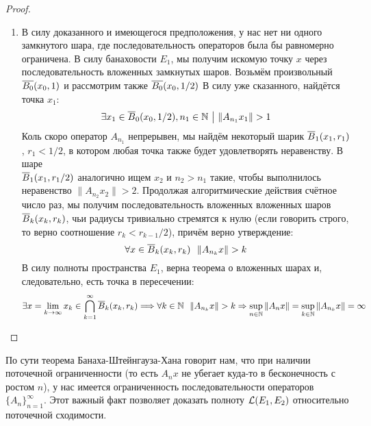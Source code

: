\begin{proof}
\begin{enumerate}
		\item В силу доказанного и имеющегося предположения, у нас нет ни одного замкнутого шара, где последовательность операторов была бы равномерно ограничена. В силу банаховости $E_1$, мы получим искомую точку $x$ через последовательность вложенных замкнутых шаров. Возьмём произвольный $\overline{B_0}(x_0, 1)$ и рассмотрим также $\overline{B_0}(x_0, 1 / 2)$ В силу уже сказанного, найдётся точка $x_1$:
		\[
			\exists x_1 \in \overline{B}_0(x_0, 1 / 2), n_1 \in \mathbb{N} \ \big|\  \|A_{n_1}x_1\| > 1
		\]
		Коль скоро оператор $A_{n_1}$ непрерывен, мы найдём некоторый шарик $\overline{B}_1(x_1, r_1)$, $r_1 < 1 / 2$, в котором любая точка также будет удовлетворять неравенству. В шаре \\ $\overline{B}_1(x_1, r_1 / 2)$ аналогично ищем $x_2$ и $n_2 > n_1$ такие, чтобы выполнилось неравенство $\|A_{n_2}x_2\| > 2$. Продолжая алгоритмические действия счётное число раз, мы получим последовательность вложенных вложенных шаров $\overline{B}_k(x_k, r_k)$, чьи радиусы тривиально стремятся к нулю (если говорить строго, то верно соотношение $r_k < r_{k - 1} / 2$), причём верно утверждение:
		\[
			\forall x \in \overline{B}_k(x_k, r_k)\ \ \|A_{n_k}x\| > k
		\]
		В силу полноты пространства $E_1$, верна теорема о вложенных шарах и, следовательно, есть точка в пересечении:
		\[
			\exists x = \lim_{k \to \infty} x_k \in \bigcap_{k = 1}^\infty \overline{B}_k(x_k, r_k) \Longrightarrow \forall k \in \mathbb{N}\ \ \|A_{n_k}x\| > k \Rightarrow \sup_{n \in \mathbb{N}} \|A_nx\| = \sup_{k \in \mathbb{N}} \|A_{n_k}x\| = \infty
		\]
	\end{enumerate}
\end{proof}

\begin{anote}
	По сути теорема Банаха-Штейнгауза-Хана говорит нам, что при наличии поточечной ограниченности (то есть $A_nx$ не убегает куда-то в бесконечность с ростом $n$), у нас имеется ограниченность последовательности операторов $\{A_n\}_{n = 1}^\infty$. Этот важный факт позволяет доказать полноту $\mathcal{L}(E_1, E_2)$ относительно поточечной сходимости.
\end{anote}
